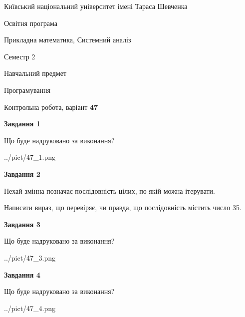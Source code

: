 \documentclass[12pt, ukrainian]{article}
\begin{document}
{{\begin {small}\par
{ \center  Київський національний університет імені Тараса Шевченка \par}
{\parbox {5 cm}{Освітня програма \hfill}{\parbox {8 cm}{Прикладна математика, Системний аналіз \hfill}}\parbox {5 cm}{\hfill Семестр 2}}\par
{\parbox {5 cm} {Навчальний предмет \hfill}\parbox {7 cm}{Програмування \hfill}\parbox {6cm}{\hfill}\par}\vspace{-7pt} \end{small}}{\center Контрольна робота, варіант  \No \textbf
{ 47 }\par}}
{
\begin {large}
{\begin {center}\textbf{Завдання 1}\end {center}}\par
Що буде надруковано за виконання?\par\par
\begin{center}
	{../pict/47_1.png}
\end{center}
\newpage

{\begin {center}\textbf{Завдання 2}\end {center}}\par
Нехай змінна  позначає послідовність цілих, по якій можна ітерувати.

Написати вираз, що перевіряє, чи правда, що послідовність  містить число 35.\par
\newpage

{\begin {center}\textbf{Завдання 3}\end {center}}\par
Що буде надруковано за виконання?
\begin{center}
	{../pict/47_3.png}
\end{center}
\newpage

{\begin {center}\textbf{Завдання 4}\end {center}}\par
Що буде надруковано за виконання?\par
\begin{center}
	{../pict/47_4.png}
\end{center}
\newpage


\end{large}}
\end{document}
